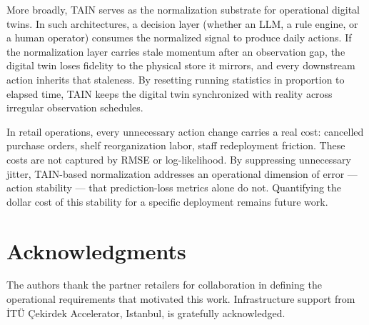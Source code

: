 \documentclass[11pt,a4paper]{article}
\begin{document}
More broadly, TAIN serves as the normalization substrate for operational digital
twins. In such architectures, a decision layer (whether an LLM, a rule engine,
or a human operator) consumes the normalized signal to produce daily actions. If
the normalization layer carries stale momentum after an observation gap, the
digital twin loses fidelity to the physical store it mirrors, and every
downstream action inherits that staleness. By resetting running statistics in
proportion to elapsed time, TAIN keeps the digital twin synchronized with
reality across irregular observation schedules.

In retail operations, every unnecessary action change carries a real cost:
cancelled purchase orders, shelf reorganization labor, staff redeployment
friction. These costs are not captured by RMSE or log-likelihood. By
suppressing unnecessary jitter, TAIN-based normalization addresses an
operational dimension of error --- action stability --- that prediction-loss
metrics alone do not. Quantifying the dollar cost of this stability for a
specific deployment remains future work.

\section*{Acknowledgments}

The authors thank the partner retailers for collaboration in defining the
operational requirements that motivated this work. Infrastructure support from
\.{I}T\"{U} \c{C}ekirdek Accelerator, Istanbul, is gratefully acknowledged.
\end{document}

